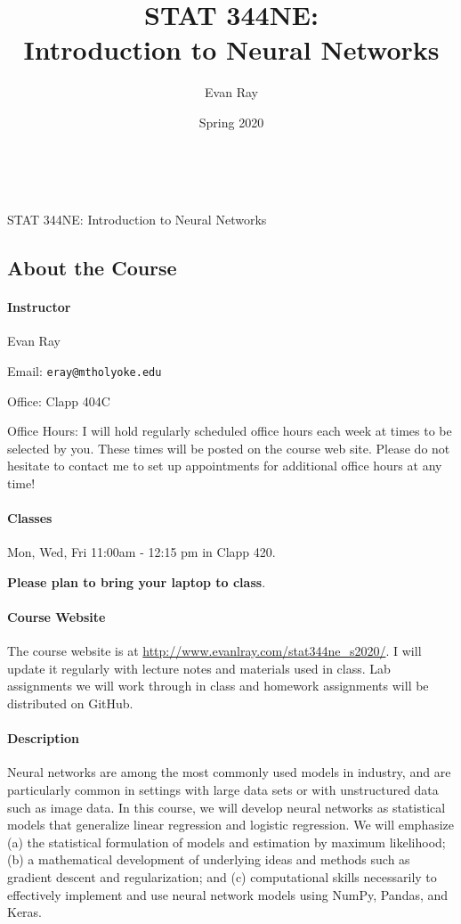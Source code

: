 \documentclass[11pt]{article}
\title{STAT 344NE:\\Introduction to Neural Networks}
\author{Evan Ray}
\date{Spring 2020}
\begin{document}

\ \\
\vspace{.01in}
\begin{center}
{\large STAT 344NE: Introduction to Neural Networks}
\end{center}
\subsection*{About the Course}

\paragraph{Instructor}

Evan Ray

Email: \texttt{eray@mtholyoke.edu}

Office: Clapp 404C

Office Hours: I will hold regularly scheduled office hours each week at times to be selected by you.  These times will be posted on the course web site.  Please do not hesitate to contact me to set up appointments for additional office hours at any time!

\paragraph{Classes} \mbox{}

Mon, Wed, Fri 11:00am - 12:15 pm in Clapp 420.

\textbf{Please plan to bring your laptop to class}.

\paragraph{Course Website}
The course website is at \url{http://www.evanlray.com/stat344ne_s2020/}.  I will update it regularly with lecture notes and materials used in class.  Lab assignments we will work through in class and homework assignments will be distributed on GitHub.

\paragraph{Description}

Neural networks are among the most commonly used models in industry, and are particularly common in settings with large data sets or with unstructured data such as image data.  In this course, we will develop neural networks as statistical models that generalize linear regression and logistic regression.  We will emphasize (a) the statistical formulation of models and estimation by maximum likelihood; (b) a mathematical development of underlying ideas and methods such as gradient descent and regularization; and (c) computational skills necessarily to effectively implement and use neural network models using NumPy, Pandas, and Keras.
\end{document}
